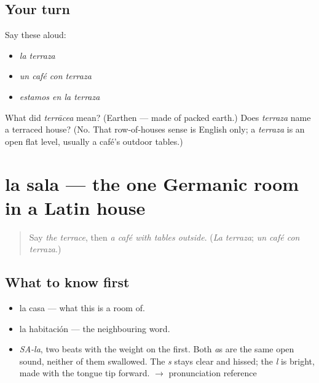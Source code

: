 \subsection*{Your turn}
Say these aloud:

\begin{itemize}
\raggedright
  \item \emph{la terraza}
  \item \emph{un café con terraza}
  \item \emph{estamos en la terraza}
\end{itemize}

\begin{tcolorbox}[breakable,colback=teal!4,colframe=teal!35!black,title={Before you move on}]
What did \emph{terrācea} mean? (Earthen — made of packed earth.) Does \emph{terraza} name a terraced house? (No. That row-of-houses sense is English only; a \emph{terraza} is an open flat level, usually a café's outdoor tables.)
\end{tcolorbox}
\section[la sala]{la sala — the one Germanic room in a Latin house}

\label{lesson:ES-C390-sala}



\begin{quote}
Say \emph{the terrace}, then \emph{a café with tables outside}. (\emph{La terraza}; \emph{un café con terraza}.)
\end{quote}

\subsection*{What to know first}
\begin{itemize}
\raggedright
  \item la casa — what this is a room of.
  \item la habitación — the neighbouring word.
\end{itemize}

\begin{sounds}
\begin{itemize}
\raggedright
  \item \emph{SA-la}, two beats with the weight on the first. Both \emph{a}s are the same open sound, neither of them swallowed. The \emph{s} stays clear and hissed; the \emph{l} is bright, made with the tongue tip forward. $\to$ pronunciation reference
\end{itemize}
\end{sounds}

